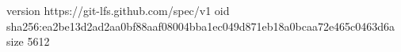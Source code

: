 version https://git-lfs.github.com/spec/v1
oid sha256:ea2be13d2ad2aa0bf88aaf08004bba1ec049d871eb18a0bcaa72e465c0463d6a
size 5612

